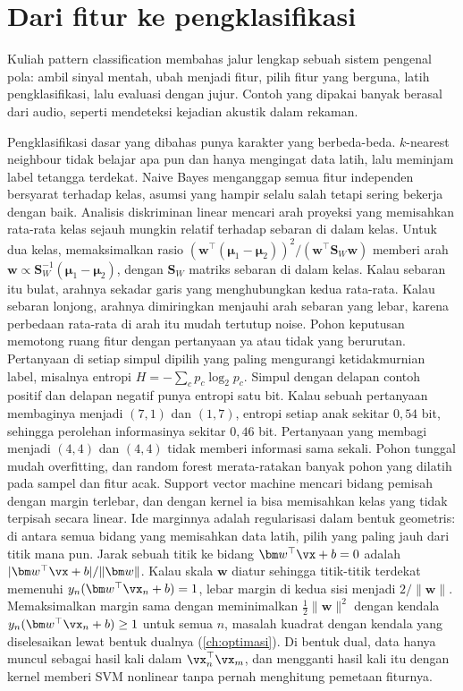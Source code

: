 \section{Dari fitur ke pengklasifikasi}

Kuliah pattern classification membahas jalur lengkap sebuah sistem pengenal pola: ambil sinyal
mentah, ubah menjadi fitur, pilih fitur yang berguna, latih pengklasifikasi, lalu evaluasi dengan
jujur. Contoh yang dipakai banyak berasal dari audio, seperti mendeteksi kejadian akustik dalam
rekaman.

Pengklasifikasi dasar yang dibahas punya karakter yang berbeda-beda. $k$-nearest neighbour tidak
belajar apa pun dan hanya mengingat data latih, lalu meminjam label tetangga terdekat. Naive Bayes
menganggap semua fitur independen bersyarat terhadap kelas, asumsi yang hampir selalu salah tetapi
sering bekerja dengan baik. Analisis diskriminan linear \citep{fisher1936} mencari arah proyeksi
yang memisahkan rata-rata kelas sejauh mungkin relatif terhadap sebaran di dalam kelas. Untuk dua kelas,
memaksimalkan rasio $(\bm w^\top(\bm\mu_1-\bm\mu_2))^2/(\bm w^\top\bm S_W\bm w)$ memberi arah
$\bm w\propto\bm S_W^{-1}(\bm\mu_1-\bm\mu_2)$, dengan $\bm S_W$ matriks sebaran di dalam kelas. Kalau sebaran itu bulat,
arahnya sekadar garis yang menghubungkan kedua rata-rata. Kalau sebaran lonjong, arahnya dimiringkan menjauhi arah
sebaran yang lebar, karena perbedaan rata-rata di arah itu mudah tertutup noise. Pohon
keputusan memotong ruang fitur dengan pertanyaan ya atau tidak yang berurutan. Pertanyaan di setiap simpul dipilih
yang paling mengurangi ketidakmurnian label, misalnya entropi $H=-\sum_cp_c\log_2p_c$. Simpul dengan delapan contoh
positif dan delapan negatif punya entropi satu bit. Kalau sebuah pertanyaan membaginya menjadi $(7,1)$ dan $(1,7)$,
entropi setiap anak sekitar $0{,}54$ bit, sehingga perolehan informasinya sekitar $0{,}46$ bit. Pertanyaan yang membagi
menjadi $(4,4)$ dan $(4,4)$ tidak memberi informasi sama sekali. Pohon tunggal mudah overfitting, dan random forest
\citep{breiman2001} merata-ratakan banyak pohon yang dilatih pada sampel dan fitur acak. Support
vector machine \citep{cortes1995} mencari bidang pemisah dengan margin terlebar, dan dengan kernel ia
bisa memisahkan kelas yang tidak terpisah secara linear. Ide marginnya adalah regularisasi dalam
bentuk geometris: di antara semua bidang yang memisahkan data latih, pilih yang paling jauh dari
titik mana pun. Jarak sebuah titik ke bidang $\bm w^\top\vx+b=0$ adalah $|\bm w^\top\vx+b|/\|\bm w\|$. Kalau skala $\bm w$
diatur sehingga titik-titik terdekat memenuhi $y_n(\bm w^\top\vx_n+b)=1$, lebar margin di kedua sisi menjadi
$2/\|\bm w\|$. Memaksimalkan margin sama dengan meminimalkan $\tfrac12\|\bm w\|^2$ dengan kendala
$y_n(\bm w^\top\vx_n+b)\ge1$ untuk semua $n$, masalah kuadrat dengan kendala yang diselesaikan lewat bentuk dualnya
(\cref{ch:optimasi}). Di bentuk dual, data hanya muncul sebagai hasil kali dalam $\vx_n^\top\vx_m$, dan mengganti hasil
kali itu dengan kernel memberi SVM nonlinear tanpa pernah menghitung pemetaan fiturnya.

